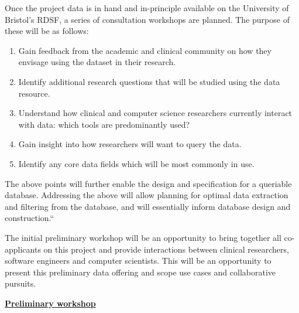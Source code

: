 \documentclass{article}
\begin{document}
Once the project data is in hand and in-principle available on the
University of Bristol's RDSF, a series of consultation workshops are
planned. The purpose of these will be as follows:

\begin{enumerate}
\item Gain feedback from the academic and clinical
  community on how they envisage using the dataset in their
  research. 
\item Identify additional research questions that will be studied using the data
  resource.
\item Understand how clinical and computer science researchers
  currently interact with data: which tools are predominantly used?
\item Gain insight into how researchers will want to query the
  data.
\item Identify any core data fields which will be most commonly
  in use.
\end{enumerate}

The above points will further enable the design and specification for
a queriable database. Addressing the above will allow planning for
optimal data extraction and filtering from the database, and will
essentially inform database design and construction.``

The initial preliminary workshop will be an opportunity to bring
together all co-applicants on this project and provide interactions
between clinical researchers, software engineers and computer
scientists. This will be an opportunity to present this preliminary
data offering and scope use cases and collaborative pursuits. 

\textbf{\underline{Preliminary workshop}}\\
\end{document}
